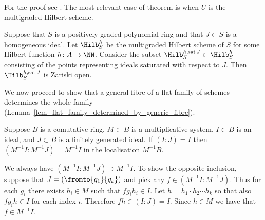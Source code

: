 \documentclass[12pt,a4paper]{article}
\DeclareMathOperator{\sat}{sat}
\begin{document}
For the proof see \cite[Thm~2.3]{jelisiejew_mandziuk_limits_of_saturated_ideals}.
The most relevant case of theorem is when $U$ is the multigraded Hilbert scheme.

\begin{cor}
  Suppose that $S$ is a positively graded polynomial ring and that $J \subset S$ is a homogeneous ideal.
  Let $\Hilb^h_S$ be the multigraded Hilbert scheme of $S$ for some Hilbert function $h\colon A\to \NN$.
  Consider the subset $\Hilb_S^{h, \sat J} \subset \Hilb^h_S$
    consisting of the points representing ideals saturated with respect to $J$.
  Then $\Hilb_S^{h, \sat J}$ is Zariski open.
\end{cor}

We now proceed to show that a general fibre of a flat family of schemes determines the whole family (Lemma~\ref{lem_flat_family_determined_by_generic_fibre}).

\begin{lemma}
\label{lem_saturated_is_preserved_by_localisation}
   Suppose $B$ is a comutative ring, $M\subset B$ is a multiplicative system, $I \subset B$ is an ideal,
   and $J \subset B$ is a finitely generated ideal.
   If $(I:J)=I$ then $(M^{-1} I : M^{-1} J) = M^{-1} I$ in the localisation $M^{-1}B$.
\end{lemma}
\begin{prf}
   We always have $(M^{-1} I : M^{-1} J) \supset M^{-1} I$.
   To show the opposite inclusion,
   suppose that $J= (\fromto{g_1}{g_k})$ and pick any $f\in (M^{-1} I : M^{-1} J)$.
   Thus for each $g_i$ there exists $h_i \in M$ such that $ f g_i h_i \in I$.
   Let $h = h_1\cdot h_2 \dotsm h_k$ so that also
   $ f g_i h \in I$ for each index $i$.
   Therefore $f h\in (I : J) = I$.
   Since $h\in M$ we have that $f\in M^{-1} I$.
\end{prf}
\end{document}

